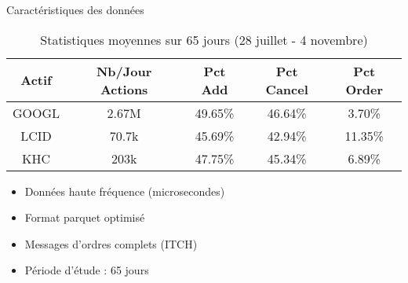 \documentclass[aspectratio=169]{beamer}  %
\begin{document}
\begin{frame}{Caractéristiques des données}
    \begin{table}
    \centering
    \begin{tabular}{|c|c|c|c|c|}
    \hline
    \textbf{Actif} & \textbf{Nb/Jour Actions} & \textbf{Pct Add} & \textbf{Pct Cancel} & \textbf{Pct Order} \\ \hline
    GOOGL & 2.67M & 49.65\% & 46.64\% & 3.70\% \\ \hline
    LCID & 70.7k & 45.69\% & 42.94\% & 11.35\% \\ \hline
    KHC & 203k & 47.75\% & 45.34\% & 6.89\% \\ \hline
    \end{tabular}
    \caption{Statistiques moyennes sur 65 jours (28 juillet - 4 novembre)}
    \end{table}
    \vspace{0.3cm}
    \begin{itemize}
        \item Données haute fréquence (microsecondes)
        \item Format parquet optimisé
        \item Messages d'ordres complets (ITCH)
        \item Période d'étude : 65 jours
    \end{itemize}
\end{frame}
\end{document}

